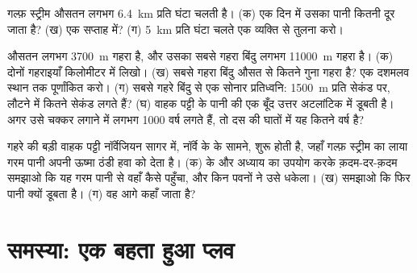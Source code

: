 \begin{exercise}[$\star\star$]\label{exo:g8:the-oceans:10}
गल्फ़ स्ट्रीम औसतन लगभग \qty{6.4}{km} प्रति घंटा चलती है। (क) एक दिन में उसका पानी
कितनी दूर जाता है? (ख) एक सप्ताह में? (ग) \qty{5}{km} प्रति घंटा चलते एक व्यक्ति
से तुलना करो।
\end{exercise}

\begin{exercise}[$\star\star\star$]\label{exo:g8:the-oceans:11}
 औसतन लगभग \qty{3700}{m} गहरा है, और उसका सबसे गहरा बिंदु लगभग
\qty{11000}{m} गहरा है। (क) दोनों गहराइयाँ किलोमीटर में लिखो। (ख) सबसे गहरा बिंदु
औसत से कितने गुना गहरा है? एक दशमलव स्थान तक पूर्णांकित करो। (ग) सबसे गहरे बिंदु से
एक सोनार प्रतिध्वनि: \qty{1500}{m} प्रति सेकंड पर, लौटने में कितने सेकंड लगते हैं?
(घ) वाहक पट्टी के पानी की एक बूँद उत्तर अटलांटिक में डूबती है। अगर उसे चक्कर लगाने में
लगभग \num{1000} वर्ष लगते हैं, तो दस की घातों में यह कितने वर्ष
है?
\end{exercise}

\begin{exercise}[$\star\star\star$]\label{exo:g8:the-oceans:12}
गहरे  की बड़ी वाहक पट्टी नॉर्वेजियन सागर में, नॉर्वे के  के सामने, शुरू होती है,
जहाँ गल्फ़ स्ट्रीम का लाया गरम पानी अपनी ऊष्मा ठंडी हवा को देता है। (क)  के
 और अध्याय का उपयोग करके क़दम-दर-क़दम समझाओ कि यह गरम पानी  से वहाँ
कैसे पहुँचा, और किन पवनों ने उसे धकेला। (ख) समझाओ कि फिर पानी क्यों डूबता है। (ग) वह
आगे कहाँ जाता
है?
\end{exercise}

\section{समस्या: एक बहता हुआ प्लव}

